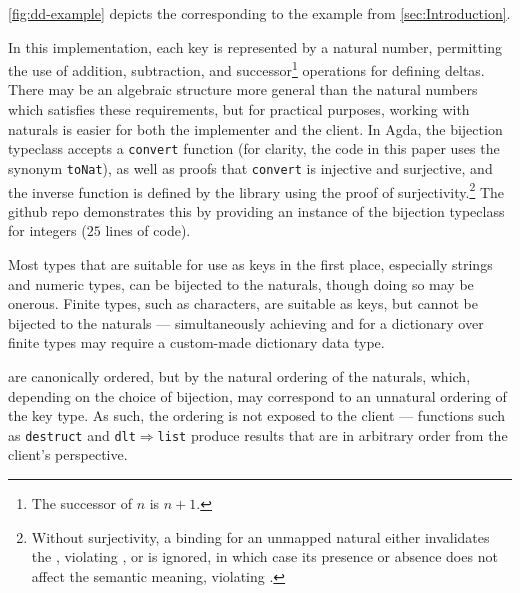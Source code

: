 \autoref{fig:dd-example} depicts the \dd{} corresponding to the example from \autoref{sec:Introduction}.


In this implementation, each key is represented by a natural number, permitting the use of addition, subtraction, and successor\footnote{The successor of $n$ is $n+1$.} operations for defining deltas.
%
There may be an algebraic structure more general than the natural numbers which satisfies these requirements, but for practical purposes, working with naturals
%
is easier for both the implementer and the client. In Agda, the bijection typeclass accepts a \texttt{convert} function (for clarity, the code in this paper uses the synonym \texttt{toNat}), as well as proofs that \texttt{convert}
%
is injective and surjective, and the inverse function is defined by the library using the proof of surjectivity.\footnote{\hspace{0.01in}%
%
Without surjectivity, a binding for an unmapped natural either invalidates the \dd, violating \Total, or is ignored, in which case its presence or absence does not affect the semantic meaning, violating \Extensional.
%
}
%
The github repo \citep{github:agda} demonstrates this by providing an instance of the bijection typeclass for integers ($25$ lines of code).

Most types that are suitable for use as keys in the first place, especially strings and numeric types, can be bijected to the naturals,
%
though doing so may be onerous. Finite types, such as characters, are suitable as keys, but cannot be bijected to the naturals ---
%
simultaneously achieving \Total{} and \Extensional{} for a dictionary over finite types may require a custom-made dictionary data type.

\Ddls{} are canonically ordered, but by the natural ordering of the naturals, which, depending on the choice of bijection, may correspond to an unnatural
%
ordering of the key type. As such, the ordering is not exposed to the client --- functions such as \texttt{destruct} and \texttt{dlt$\Rightarrow$list} produce results
%
that are in arbitrary order from the client's perspective.


